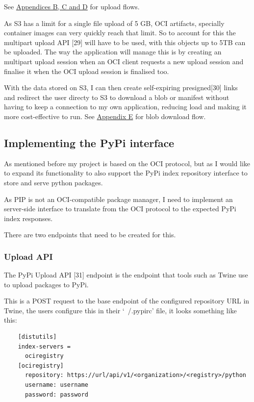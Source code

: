 \documentclass{article}
\begin{document}
  See \hyperref[sec:appendix-b]{Appendices B, C and D} for upload flows.

  As S3 has a limit for a single file upload of 5 GB, OCI artifacts, specially container images can very quickly reach that limit. So to account for this the multipart upload API [29] will have to be used, with this objects up to 5TB can be uploaded. The way the application will manage this is by creating an multipart upload session when an OCI client requests a new upload session and finalise it when the OCI upload session is finalised too.

  With the data stored on S3, I can then create self-expiring presigned[30] links and redirect the user directy to S3 to download a blob or manifest without having to keep a connection to my own application, reducing load and making it more cost-effective to run. See \hyperref[sec:appendix-e]{Appendix E} for blob download flow.

  \subsection{Implementing the PyPi interface}

  As mentioned before my project is based on the OCI protocol, but as I would like to expand its functionality to also support the PyPi index repository interface to store and serve python packages.

  As PIP is not an OCI-compatible package manager, I need to implement an server-side interface to translate from the OCI protocol to the expected PyPi index responses.

  There are two endpoints that need to be created for this.

  \subsubsection{Upload API}

  The PyPi Upload API [31] endpoint is the endpoint that tools such as Twine use to upload packages to PyPi.

  This is a POST request to the base endpoint of the configured repository URL in Twine, the users configure this in their `~/.pypirc' file, it looks something like this:

  \begin{lstlisting}
    [distutils]
    index-servers =
      ociregistry
    [ociregistry]
      repository: https://url/api/v1/<organization>/<registry>/python
      username: username
      password: password
  \end{lstlisting}
\end{document}
